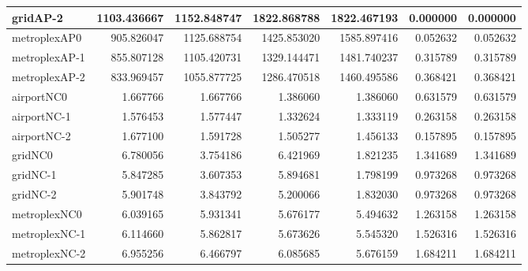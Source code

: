 \begin{longtable}{|l|r|r|r|r|r|r|}
gridAP-2 & 1103.436667 & 1152.848747 & 1822.868788 & 1822.467193 & 0.000000 & 0.000000 \\ \hline
metroplexAP0 & 905.826047 & 1125.688754 & 1425.853020 & 1585.897416 & 0.052632 & 0.052632 \\ \hline
metroplexAP-1 & 855.807128 & 1105.420731 & 1329.144471 & 1481.740237 & 0.315789 & 0.315789 \\ \hline
metroplexAP-2 & 833.969457 & 1055.877725 & 1286.470518 & 1460.495586 & 0.368421 & 0.368421 \\ \hline
airportNC0 & 1.667766 & 1.667766 & 1.386060 & 1.386060 & 0.631579 & 0.631579 \\ \hline
airportNC-1 & 1.576453 & 1.577447 & 1.332624 & 1.333119 & 0.263158 & 0.263158 \\ \hline
airportNC-2 & 1.677100 & 1.591728 & 1.505277 & 1.456133 & 0.157895 & 0.157895 \\ \hline
gridNC0 & 6.780056 & 3.754186 & 6.421969 & 1.821235 & 1.341689 & 1.341689 \\ \hline
gridNC-1 & 5.847285 & 3.607353 & 5.894681 & 1.798199 & 0.973268 & 0.973268 \\ \hline
gridNC-2 & 5.901748 & 3.843792 & 5.200066 & 1.832030 & 0.973268 & 0.973268 \\ \hline
metroplexNC0 & 6.039165 & 5.931341 & 5.676177 & 5.494632 & 1.263158 & 1.263158 \\ \hline
metroplexNC-1 & 6.114660 & 5.862817 & 5.673626 & 5.545320 & 1.526316 & 1.526316 \\ \hline
metroplexNC-2 & 6.955256 & 6.466797 & 6.085685 & 5.676159 & 1.684211 & 1.684211 \\ \hline
\end{longtable}
